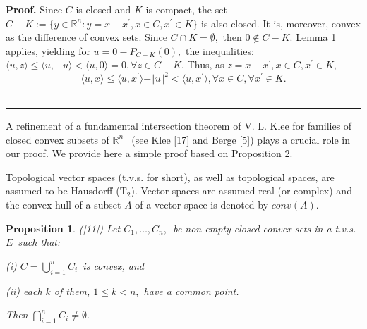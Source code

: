 \documentclass{article}
\newtheorem{proposition}[theorem]{Proposition}
\newenvironment{proof}[1][Proof]{\noindent\textbf{#1.} }{\ \rule{0.5em}{0.5em}}
\begin{document}
\begin{proof}
Since $C$ is closed and $K$ is compact, the set $C-K:=\{y\in 
\mathbb{R}
^{n}:y=x-x^{\prime },x\in C,x^{\prime }\in K\}$ is also closed. It is,
moreover, convex as the difference of convex sets. Since $C\cap K=\emptyset
, $ then $0\notin C-K.$ Lemma 1 applies, yielding for $u=0-P_{C-K}(0),$ the
inequalities: $\langle u,z\rangle \leq \langle u,-u\rangle <\langle
u,0\rangle =0,\forall z\in C-K.$ Thus, as $z=x-x^{\prime },x\in C,x^{\prime
}\in K,$%
\begin{equation*}
\langle u,x\rangle \leq \langle u,x^{\prime }\rangle -\Vert u\Vert
^{2}<\langle u,x^{\prime }\rangle ,\forall x\in C,\forall x^{\prime }\in K.
\end{equation*}%
\bigskip
\end{proof}

A refinement of a fundamental intersection theorem of V. L. Klee for
families of closed convex subsets of $%
\mathbb{R}
^{n\text{ }}$ (see Klee [17] and Berge [5]) plays a crucial role in our
proof. We provide here a simple proof based on Proposition 2.

Topological vector spaces (t.v.s. for short), as well as topological spaces,
are assumed to be Hausdorff (T$_{2}$). Vector spaces are assumed real (or
complex) and the convex hull of a subset $A$ of a vector space is denoted by 
$conv(A).$\bigskip

\begin{proposition}
([11]) \textit{Let }$C_{1},\ldots ,C_{n},$\textit{\ be non empty closed
convex sets in a t.v.s. }$E$\textit{\ such that:}

\textit{(i) }$C=\bigcup_{i=1}^{n}C_{i}$\textit{\ is convex, and}

\textit{(ii) each }$k$ of them, $1\leq k<n,$ have a common point.

\textit{Then }$\bigcap_{i=1}^{n}C_{i}\neq \emptyset .$
\end{proposition}
\end{document}
